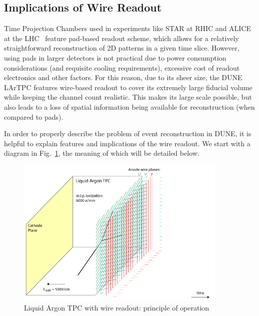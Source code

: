\subsection{Implications of Wire Readout}
Time Projection Chambers used in experiments like STAR at RHIC and ALICE at the LHC~\cite{alice}  feature
pad-based readout scheme, which allows for a relatively straightforward reconstruction of 2D patterns in
a given time slice. However, using pads in larger detectors is not practical due to power consumption considerations
(and requisite cooling requirements), excessive cost of readout electronics and other factors. For this reason, due
to its sheer size, the DUNE LArTPC features wire-based readout to cover its extremely large fiducial volume while
keeping the channel count realistic. This makes its large scale possible, but also leads to a loss of spatial information
being available for reconstruction (when compared to pads).

In order to properly describe the problem of event reconstruction in DUNE, it is helpful to explain
features and implications of the wire readout. We start with a diagram in Fig.~\ref{fig:signal-0}, the meaning of which will be detailed below.

\begin{figure}[h!]
	\centering
	\includegraphics[width=0.9\textwidth]{signal-0.png}
	\caption{Liquid Argon TPC with wire readout: principle of operation}
	\label{fig:signal-0}
\end{figure}


